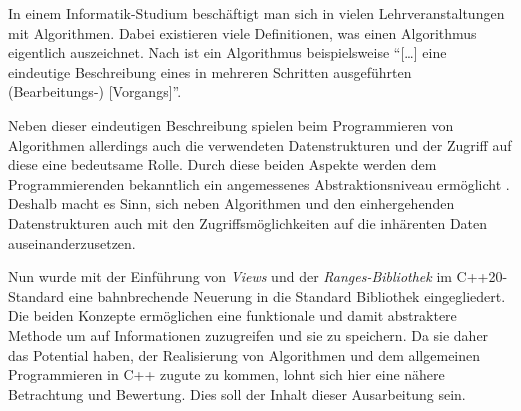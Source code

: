 \documentclass[runningheads]{llncs}
\begin{document}
In einem Informatik-Studium beschäftigt man sich in vielen Lehrveranstaltungen mit Algorithmen.
Dabei existieren viele Definitionen, was einen Algorithmus eigentlich auszeichnet.
Nach \cite[S.4]{aud} ist ein Algorithmus beispielsweise \enquote{[\dots] eine eindeutige Beschreibung eines in mehreren Schritten ausgeführten \mbox{(Bearbeitungs-)} [Vorgangs]}.

Neben dieser eindeutigen Beschreibung spielen beim Programmieren von Algorithmen allerdings auch die verwendeten Datenstrukturen und der Zugriff auf diese eine bedeutsame Rolle.
Durch diese beiden Aspekte werden dem Programmierenden bekanntlich ein angemessenes Abstraktionsniveau ermöglicht \cite{aud}.
Deshalb macht es Sinn, sich neben Algorithmen und den einhergehenden Datenstrukturen auch mit den Zugriffsmöglichkeiten auf die inhärenten Daten auseinanderzusetzen.



Nun wurde mit der Einführung von \textit{Views} und der \textit{Ranges-Bibliothek} im C++20-Standard eine bahnbrechende Neuerung in die Standard Bibliothek eingegliedert.
Die beiden Konzepte ermöglichen eine funktionale und damit abstraktere Methode um auf Informationen zuzugreifen und sie zu speichern.
Da sie daher das Potential haben, der Realisierung von Algorithmen und dem allgemeinen Programmieren in C++ zugute zu kommen, lohnt sich hier eine nähere Betrachtung und Bewertung.
Dies soll der Inhalt dieser Ausarbeitung sein.

\end{document}
